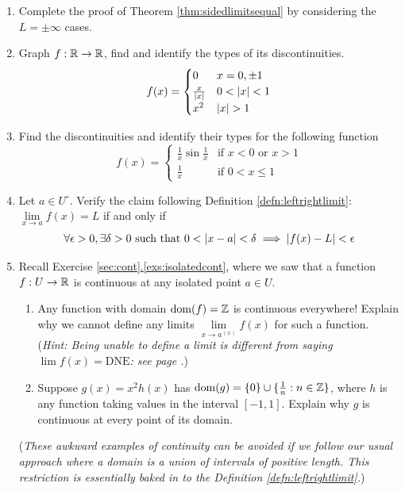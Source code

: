 \begin{exercises}
\begin{enumerate}
  \item Complete the proof of Theorem \ref{thm:sidedlimitsequal} by considering the $L=\pm\infty$ cases.
  
  \item Graph $f:\mathbb{R}\to\mathbb{R}$, find and identify the types of its discontinuities.
  \[f(x)=\begin{cases}
         0&x=0,\pm 1\\
         \frac x{\nm x}&0<\nm x<1\\
         x^2&\nm x>1
         \end{cases}\]
  
  \item Find the discontinuities and identify their types for the following function
  \[f(x)=\begin{cases}
  \frac 1x\sin\frac 1x&\text{if $x<0$ or $x>1$}\\
  \frac 1x&\text{if }0<x\le 1
  \end{cases}\]
  
  
  \item Let $a\in U^\circ$. Verify the claim following Definition \ref{defn:leftrightlimit}: $\lim\limits_{x\to a}f(x)=L$ if and only if
  \[\forall\epsilon>0,\exists\delta>0\text{ such that }0<\left| x-a\right|<\delta\implies \left| f(x)-L\right|<\epsilon\]
  
  \item Recall Exercise \hyperref[exs:isolatedcont]{\ref*{sec:cont}.\ref*{exs:isolatedcont}}, where we saw that a function $f:U\to\mathbb{R}$ is continuous at any isolated point $a\in U$.  %
  \begin{enumerate}
    \item Any function with domain $\operatorname{dom}(f)=\mathbb{Z}$ is continuous everywhere! Explain why we cannot define any limits $\lim\limits_{x\to a^{(\pm)}}f(x)$ for such a function.\\
    (\emph{Hint: Being unable to define a limit is different from saying $\lim f(x)=\text{DNE}$: see page \pageref{it:contlimit}.})
    \item Suppose $g(x)=x^2h(x)$ has $\operatorname{dom}(g)=\{0\}\cup\{\tfrac 1n:n\in\mathbb{Z}\}$, where $h$ is any function taking values in the interval $[-1,1]$. Explain why $g$ is continuous at every point of its domain.
	\end{enumerate}
	(\emph{These awkward examples of continuity can be avoided if we follow our usual approach where a domain is a union of intervals of positive length. This restriction is essentially baked in to the Definition \ref{defn:leftrightlimit}.})
  

\end{enumerate}
\end{exercises}
